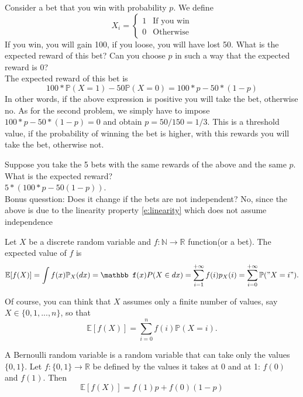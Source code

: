\begin{example}
Consider a bet that you win with probability $p$. We define 
\begin{equation}
    X_i = \begin{cases}
            1 & \textrm{If you win}\\
            0 & \textrm{Otherwise}
        \end{cases}
\end{equation}
If you win, you will gain 100, if you loose, you will have lost 50. What is the expected reward of this bet? 
Can you choose $p$ in such a way that the expected reward is 0? \\
The expected reward of this bet is 
$$
100 * \mathbb P(X = 1) - 50 \mathbb P(X = 0 ) = 100 *p - 50 *(1-p)
$$
In other words, if the above expression is positive you will take the bet, otherwise no. 
As for the second problem, we simply have to impose $100 * p - 50*(1-p) = 0$ and obtain $p = 50/150 = 1/3$. This is a threshold value, if the probability of winning the bet is higher, with this rewards you will take the bet, otherwise not. 
\end{example}

\begin{example}[Roulette]
Suppose you take the 5 bets with the same rewards of the above and the same $p$. What is the expected reward? \\
$5*(100*p- 50(1-p))$.\\
Bonus quesstion: Does it change if the bets are not independent? No, since the above is due to the linearity property \eqref{e:linearity} which does not assume independence
\end{example}


\begin{definition}
Let $X$ be a discrete random variable and $f:\mathbb N \to \mathbb R$ function(or a bet). The expected value of $f$ is 
\begin{equation}
\mathbb E[f(X)] = \int f(x)\mathbb P_X(dx)  = \mathbb f(x) P(X \in dx) = \sum_{i = 1}^{+\infty} f(i) p_X(i) =\sum_{i = 0}^{+\infty} \mathbb P("X = i").  
\end{equation}
\end{definition}
Of course, you can think that $X$ assumes only a finite number of values, say $X \in \{0,1,...,n\}$, so that 
$$
\mathbb E[f(X)] = \sum_{i = 0}^n f(i) \mathbb P(X = i ).
$$

\begin{example}
    A Bernoulli random variable is a random variable that can take only the values $\{0,1\}$. Let $f: \{0,1\} \to \mathbb R $  be defined by the values it takes at 0 and at 1: $f(0)$ and $f(1)$. Then 
    \begin{equation}
    \label{e:Bernoulli_f}
    \mathbb E[f(X)] = f(1)p + f(0)(1-p) 
    \end{equation}
\end{example}

